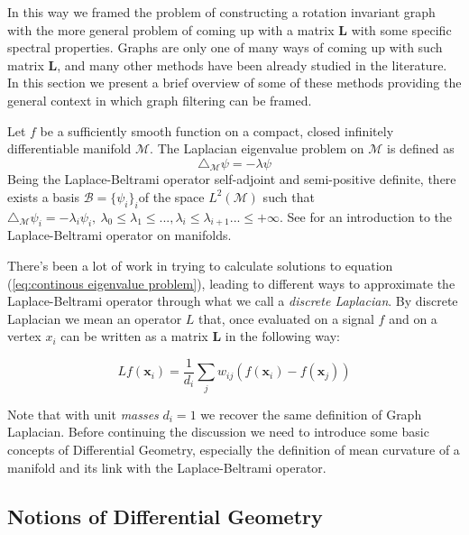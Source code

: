 In this way we framed the problem of constructing a rotation invariant graph with the more general problem of coming up with a matrix $\mathbf L$ with some specific spectral properties. Graphs are only one of many ways of coming up with such matrix $\mathbf L$, and many other methods have been already studied in the literature. In this section we present a brief overview of some of these methods providing the general context in which graph filtering can be framed.

Let $f$ be a sufficiently smooth function on a compact, closed infinitely differentiable manifold $\mathcal M$. The Laplacian eigenvalue problem on $\mathcal M$ is defined as 
\begin{equation}\label{eq:continous eigenvalue problem}
	\triangle_{\mathcal M}\psi = -\lambda \psi
\end{equation}
Being the Laplace-Beltrami operator self-adjoint and semi-positive definite, there exists a basis $\mathcal B=\{\psi_i\}_i$of the space $L^2(\mathcal M)$ such that $\triangle_\mathcal M \psi_i = -\lambda_i\psi_i,\ \lambda_0\leq\lambda_1\leq...,\lambda_i\leq\lambda_{i+1}...\leq+\infty$. See \cite{rosenberg_1997} for an introduction to the Laplace-Beltrami operator on manifolds.

There's been a lot of work in trying to calculate solutions to equation (\ref{eq:continous eigenvalue problem}), leading to different ways to approximate the Laplace-Beltrami operator through what we call a \textit{discrete Laplacian}. By discrete Laplacian we mean an operator $L$ that, once evaluated on a signal $f$ and on a vertex $x_i$ can be written as a matrix $\mathbf L$ in the following way:

\begin{equation}\label{eq:discrete laplacian}
	L f\left(\mathbf{x}_{i}\right)=\frac{1}{d_{i}} \sum_{j} w_{i j}\left(f\left(\mathbf{x}_{i}\right)-f\left(\mathbf{x}_{j}\right)\right)
\end{equation}

Note that with unit \textit{masses} $d_i=1$ we recover the same definition of Graph Laplacian. Before continuing the discussion we need to introduce some basic concepts of Differential Geometry, especially the definition of mean curvature of a manifold and its link with the Laplace-Beltrami operator.

\subsection{Notions of Differential Geometry}

